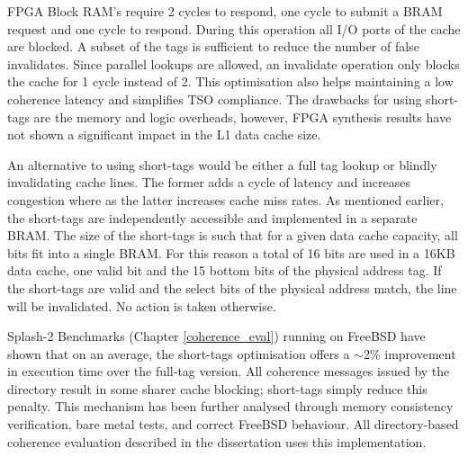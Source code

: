 		FPGA Block RAM's require 2 cycles to respond, one cycle to submit a BRAM request and one cycle to respond. During this operation all I/O ports of the cache are blocked. A subset of the tags is sufficient to reduce the number of false invalidates. Since parallel lookups are allowed, an invalidate operation only blocks the cache for 1 cycle instead of 2. This optimisation also helps maintaining a low coherence latency and simplifies TSO compliance. The drawbacks for using short-tags are the memory and logic overheads, however, FPGA synthesis results have not shown a significant impact in the L1 data cache size.

		An alternative to using short-tags would be either a full tag lookup or blindly invalidating cache lines. The former adds a cycle of latency and increases congestion where as the latter increases cache miss rates. As mentioned earlier, the short-tags are independently accessible and implemented in a separate BRAM. The size of the short-tags is such that for a given data cache capacity, all bits fit into a single BRAM. For this reason a total of 16 bits are used in a 16KB data cache, one valid bit and the 15 bottom bits of the physical address tag. 
		If the short-tags are valid and the select bits of the physical address match, the line will be invalidated. No action is taken otherwise. 
		
		Splash-2 Benchmarks (Chapter \ref{coherence_eval}) running on FreeBSD have shown that on an average, the short-tags optimisation offers a $\sim$2\% improvement in execution time over the full-tag version. All coherence messages issued by the directory result in some sharer cache blocking; short-tags simply reduce this penalty. This mechanism has been further analysed through memory consistency verification, bare metal tests, and correct FreeBSD behaviour. All directory-based coherence evaluation described in the dissertation uses this implementation.

